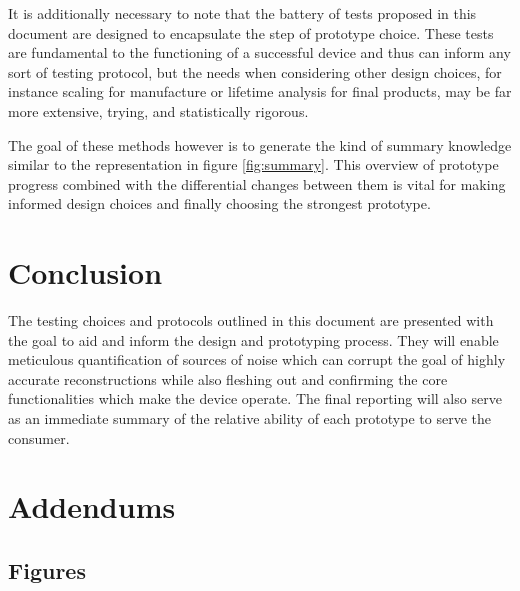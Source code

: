\documentclass{article}
\begin{document}
It is additionally necessary to note that the battery of tests proposed in this document are designed to encapsulate the step of prototype choice. These tests are fundamental to the functioning of a successful device and thus can inform any sort of testing protocol, but the needs when considering other design choices, for instance scaling for manufacture or lifetime analysis for final products, may be far more extensive, trying, and statistically rigorous.

The goal of these methods however is to generate the kind of summary knowledge similar to the representation in figure \ref{fig:summary}. This overview of prototype progress combined with the differential changes between them is vital for making informed design choices and finally choosing the strongest prototype.

\section{Conclusion}
\label{sec:conclusion}

The testing choices and protocols outlined in this document are presented with the goal to aid and inform the design and prototyping process. They will enable meticulous quantification of sources of noise which can corrupt the goal of highly accurate reconstructions while also fleshing out and confirming the core functionalities which make the device operate. The final reporting will also serve as an immediate summary of the relative ability of each prototype to serve the consumer.

\section{Addendums}
\label{sec:addendums}

\subsection{Figures}
\label{sec:figures}

\newpage
{}


\end{document}
